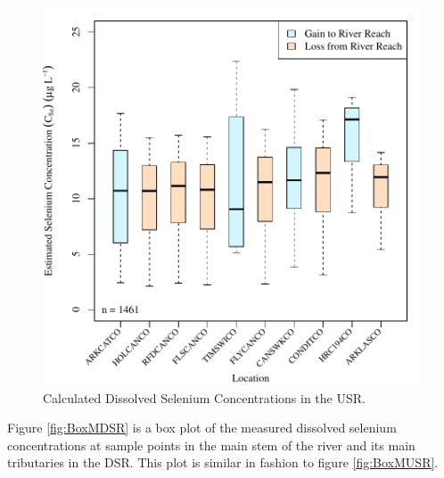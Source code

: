 \begin{linenumbers}
\begin{figure}[htbp]
\centering
	\includegraphics[width=6in]{"Figures/Results_USR/c BOX Estimated CSe"}
	\caption[Calculated Dissolved Selenium Concentrations in the USR.]{Calculated Dissolved Selenium Concentrations in the USR.}
	\label{fig:BoxCUSR}
\end{figure}

Figure \ref{fig:BoxMDSR} is a box plot of the measured dissolved selenium concentrations at sample points in the main stem of the river and its main tributaries in the DSR.  This plot is similar in fashion to figure \ref{fig:BoxMUSR}.


\end{linenumbers}
